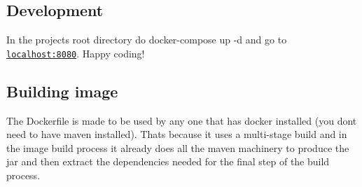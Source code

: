 \subsection*{Development}

In the project\textquotesingle{}s root directory do {\ttfamily docker-\/compose up -\/d} and go to \href{http://localhost:8080}{\tt localhost\+:8080}. Happy coding!

\subsection*{Building image}

The {\ttfamily Dockerfile} is made to be used by any one that has docker installed (you don\textquotesingle{}t need to have maven installed). That\textquotesingle{}s because it uses a multi-\/stage build and in the image build process it already does all the maven machinery to produce the jar and then extract the dependencies needed for the final step of the build process. 
